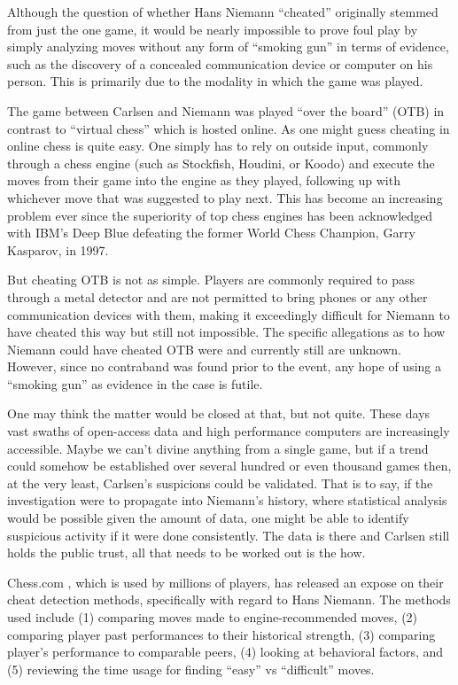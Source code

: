 \documentclass[12pt, letterpaper, titlepage]{article}
\begin{document}
Although the question of whether Hans Niemann “cheated” originally stemmed from just the one game, it would be
 nearly impossible to prove foul play by simply analyzing moves without any form of “smoking gun” in terms of 
 evidence, such as the discovery of a concealed communication device or computer on his person. This is 
 primarily due to the modality in which the game was played.

The game between Carlsen and Niemann was played “over the board” (OTB) in contrast to “virtual chess” which
 is hosted online. As one might guess cheating in online chess is quite easy. One simply has to rely on 
 outside input, commonly through a chess engine (such as Stockfish, Houdini, or Koodo) and execute the moves 
 from their game into the engine as they played, following up with whichever move that was suggested to play
  next. This has become an increasing problem ever since the superiority of top chess engines has been 
  acknowledged with IBM's Deep Blue defeating the former World Chess Champion, Garry Kasparov, in 1997.

But cheating OTB is not as simple. Players are commonly required to pass through a metal detector and are 
not permitted to bring phones or any other communication devices with them, making it exceedingly difficult
 for Niemann to have cheated this way but still not impossible. The specific allegations as to how Niemann
  could have cheated OTB were and currently still are unknown. However, since no contraband was found prior 
  to the event, any hope of using a “smoking gun” as evidence in the case is futile.

One may think the matter would be closed at that, but not quite. These days vast swaths of open-access data
 and high performance computers are increasingly accessible. Maybe we can't divine anything from a single 
 game, but if a trend could somehow be established over several hundred or even thousand games then, at the
  very least, Carlsen's suspicions could be validated. That is to say, if the investigation were to propagate 
  into Niemann's history, where statistical analysis would be possible given the amount of data, one might be 
  able to identify suspicious activity if it were done consistently. The data is there and Carlsen still holds
   the public trust, all that needs to be worked out is the how.

Chess.com \citep{chess2022cheating}, which is used by millions of players, has released an expose on their 
cheat detection methods, specifically with regard to Hans Niemann. The methods used include (1) comparing 
moves made to engine-recommended moves, (2) comparing player past performances to their historical strength, 
(3) comparing player's performance to comparable peers, (4) looking at behavioral factors, and (5) reviewing 
the time usage for finding “easy” vs “difficult” moves.
\end{document}
